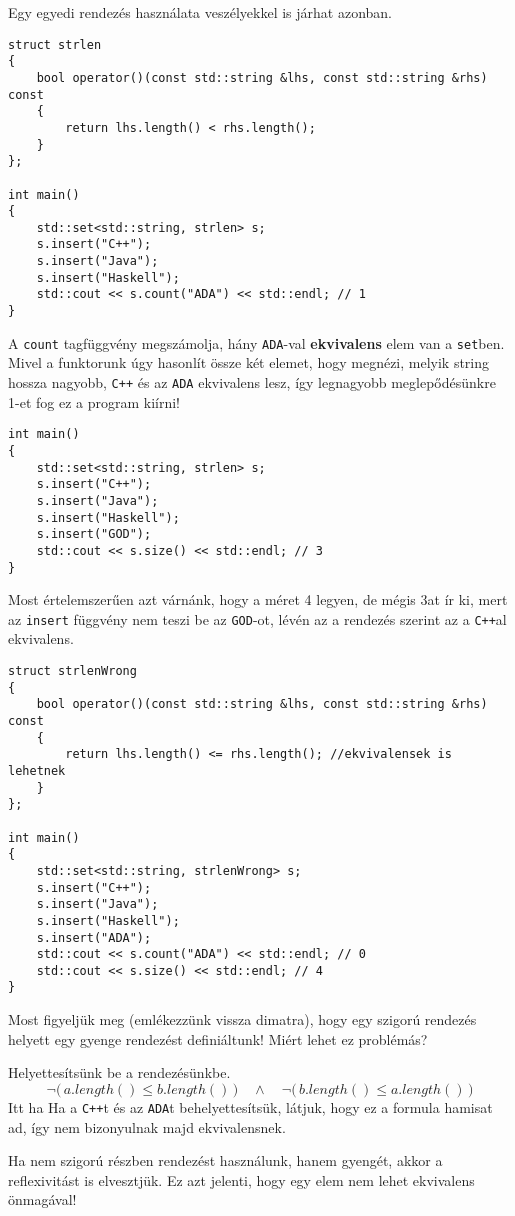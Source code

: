 \documentclass[a4paper,11.5pt]{article}
\begin{document}
	Egy egyedi rendezés használata veszélyekkel is járhat azonban.
	\begin{lstlisting}
struct strlen
{
	bool operator()(const std::string &lhs, const std::string &rhs) const
	{
		return lhs.length() < rhs.length();
	}
};

int main()
{
	std::set<std::string, strlen> s;
	s.insert("C++");
	s.insert("Java");
	s.insert("Haskell");
	std::cout << s.count("ADA") << std::endl; // 1
}
	\end{lstlisting}
	A \texttt{count} tagfüggvény megszámolja, hány \texttt{ADA}-val \textbf{ekvivalens} elem van a \texttt{set}ben. Mivel a funktorunk úgy hasonlít össze két elemet, hogy megnézi, melyik string hossza nagyobb, \texttt{C++} és az \texttt{ADA} ekvivalens lesz, így legnagyobb meglepődésünkre 1-et fog ez a program kiírni!
\begin{lstlisting}
int main()
{
	std::set<std::string, strlen> s;
	s.insert("C++");
	s.insert("Java");
	s.insert("Haskell");
	s.insert("GOD");
	std::cout << s.size() << std::endl; // 3
}
\end{lstlisting}
	Most értelemszerűen azt várnánk, hogy a méret 4 legyen, de mégis 3at ír ki, mert az \texttt{insert} függvény nem teszi be az \texttt{GOD}-ot, lévén az a rendezés szerint az a \texttt{C++}al ekvivalens.
\begin{lstlisting}
struct strlenWrong
{
	bool operator()(const std::string &lhs, const std::string &rhs) const
	{
		return lhs.length() <= rhs.length(); //ekvivalensek is lehetnek
	}
};

int main()
{
	std::set<std::string, strlenWrong> s;
	s.insert("C++");
	s.insert("Java");
	s.insert("Haskell");
	s.insert("ADA");
	std::cout << s.count("ADA") << std::endl; // 0
	std::cout << s.size() << std::endl; // 4
}
\end{lstlisting}
	Most figyeljük meg (emlékezzünk vissza dimatra), hogy egy szigorú rendezés helyett egy gyenge rendezést definiáltunk! Miért lehet ez problémás?
	
	\smallskip
	Helyettesítsünk be a rendezésünkbe.
	\[ \neg\big(\,a.length() \leq b.length()\,\big)\quad \wedge \quad \neg\big(\,b.length() \leq a.length()\,\big) \]
	Itt ha Ha a \texttt{C++}t és az \texttt{ADA}t behelyettesítsük, látjuk, hogy ez a formula hamisat ad, így nem bizonyulnak majd ekvivalensnek.
	
	Ha nem szigorú részben rendezést használunk, hanem gyengét, akkor a reflexivitást is elvesztjük. Ez azt jelenti, hogy egy elem nem lehet ekvivalens önmagával!
	
\end{document}
